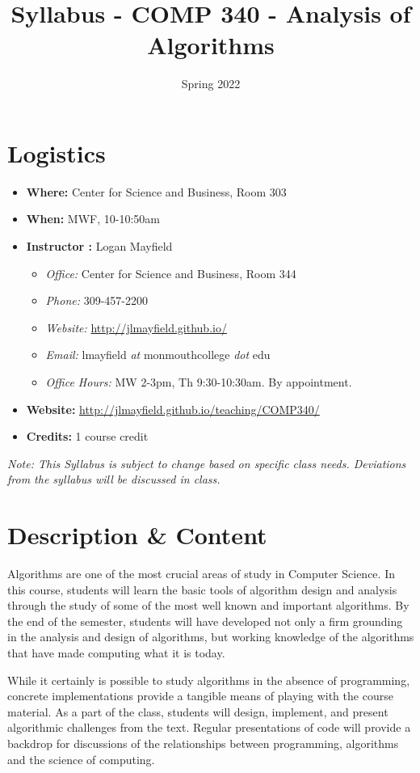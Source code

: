 \documentclass[10pt]{article}
\title{Syllabus - COMP 340 - Analysis of Algorithms}
\author{  }
\date{ Spring 2022}
\begin{document}
\maketitle

\section{Logistics}
\begin{itemize}
\item \textbf{Where: } Center for Science and Business, Room 303
\item \textbf{When: } MWF, 10-10:50am
\item \textbf{Instructor :} Logan Mayfield
\begin{itemize}
\item \textit{Office: } Center for Science and Business, Room 344
\item \textit{Phone: } 309-457-2200
\item \textit{Website: } \url{http://jlmayfield.github.io/}
\item \textit{Email: } lmayfield \textit{at} monmouthcollege \textit{dot} edu
\item \textit{Office Hours: } MW 2-3pm, Th 9:30-10:30am. By appointment.
\end{itemize}
\item \textbf{Website: } \url{http://jlmayfield.github.io/teaching/COMP340/}
\item \textbf{Credits: } 1 course credit
\end{itemize}
\emph{Note: This Syllabus is subject to change based on specific class needs. Deviations from the syllabus will be discussed in class.}

\section{Description \& Content}


Algorithms are one of the most crucial areas of study in Computer Science.  In this course, students will learn the basic tools of algorithm design and analysis through the study of some of the most well known and important algorithms.  By the end of the semester, students will have developed not only a firm grounding in the analysis and design of algorithms, but working knowledge of the algorithms that have made computing what it is today.

While it certainly is possible to study algorithms in the absence of programming, concrete implementations provide a tangible means of playing with the course material.  As a part of the class, students will design, implement, and present algorithmic challenges from the text. Regular presentations of code will provide a backdrop for discussions of the relationships between programming, algorithms and the science of computing.
\end{document}
